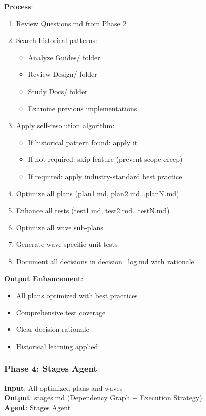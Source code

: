 \documentclass[12pt,letterpaper]{article}
\begin{document}
\textbf{Process}:
\begin{enumerate}
    \item Review Questions.md from Phase 2
    \item Search historical patterns:
    \begin{itemize}
        \item Analyze Guides/ folder
        \item Review Design/ folder
        \item Study Docs/ folder
        \item Examine previous implementations
    \end{itemize}
    \item Apply self-resolution algorithm:
    \begin{itemize}
        \item If historical pattern found: apply it
        \item If not required: skip feature (prevent scope creep)
        \item If required: apply industry-standard best practice
    \end{itemize}
    \item Optimize all plans (plan1.md, plan2.md...planN.md)
    \item Enhance all tests (test1.md, test2.md...testN.md)
    \item Optimize all wave sub-plans
    \item Generate wave-specific unit tests
    \item Document all decisions in decision\_log.md with rationale
\end{enumerate}

\textbf{Output Enhancement}:
\begin{itemize}
    \item All plans optimized with best practices
    \item Comprehensive test coverage
    \item Clear decision rationale
    \item Historical learning applied
\end{itemize}

\subsubsection{Phase 4: Stages Agent}

\textbf{Input}: All optimized plans and waves\\
\textbf{Output}: stages.md (Dependency Graph + Execution Strategy)\\
\textbf{Agent}: Stages Agent
\end{document}
